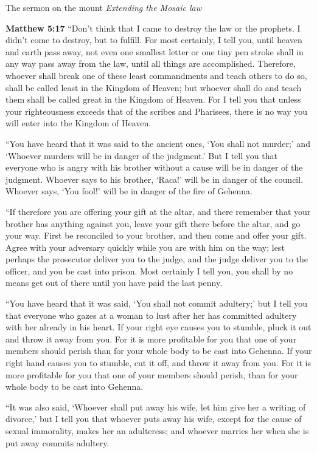 \documentclass[10pt,twoside]{book}
\newcommand{\quotesize}{\normalsize{}}
\newenvironment{quotetext}{\begingroup\quotesize}{\endgroup}
\newcommand{\bible}[2]{\begin{quotetext}\textbf{#1} #2\end{quotetext}}
\newcommand{\matthew}[2]{\bible{Matthew #1}{#2}}
\newcommand{\subhead}[1]{\emph{#1}\par}
\begin{document}
\begin{section}{The sermon on the mount}
\subhead{Extending the Mosaic law}

\matthew{5:17}{
``Don't think that I came to destroy the law or the prophets. I didn't come to destroy, but to fulfill.    For most certainly, I tell you, until heaven and earth pass away, not even one smallest letter or one tiny pen stroke shall in any way pass away from the law, until all things are accomplished.    Therefore, whoever shall break one of these least commandments and teach others to do so, shall be called least in the Kingdom of Heaven; but whoever shall do and teach them shall be called great in the Kingdom of Heaven.    For I tell you that unless your righteousness exceeds that of the scribes and Pharisees, there is no way you will enter into the Kingdom of Heaven.

   ``You have heard that it was said to the ancient ones, `You shall not murder;' and `Whoever murders will be in danger of the judgment.'    But I tell you that everyone who is angry with his brother without a cause  will be in danger of the judgment. Whoever says to his brother, `Raca!' will be in danger of the council. Whoever says, `You fool!' will be in danger of the fire of Gehenna.

   ``If therefore you are offering your gift at the altar, and there remember that your brother has anything against you,    leave your gift there before the altar, and go your way. First be reconciled to your brother, and then come and offer your gift.    Agree with your adversary quickly while you are with him on the way; lest perhaps the prosecutor deliver you to the judge, and the judge deliver you to the officer, and you be cast into prison.    Most certainly I tell you, you shall by no means get out of there until you have paid the last penny.

   ``You have heard that it was said,  `You shall not commit adultery;'    but I tell you that everyone who gazes at a woman to lust after her has committed adultery with her already in his heart.    If your right eye causes you to stumble, pluck it out and throw it away from you. For it is more profitable for you that one of your members should perish than for your whole body to be cast into Gehenna.    If your right hand causes you to stumble, cut it off, and throw it away from you. For it is more profitable for you that one of your members should perish, than for your whole body to be cast into Gehenna.

   ``It was also said, `Whoever shall put away his wife, let him give her a writing of divorce,'    but I tell you that whoever puts away his wife, except for the cause of sexual immorality, makes her an adulteress; and whoever marries her when she is put away commits adultery.

}
\end{section}
\end{document}
